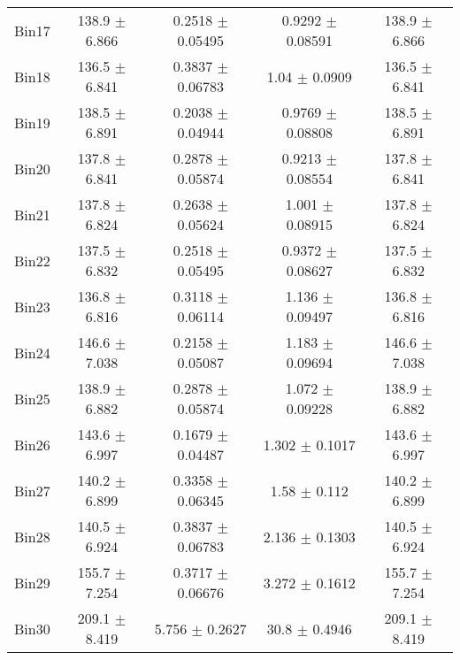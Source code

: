 \begin{tabular}{@{\extracolsep{4pt}}lcccc@{}}
     Bin17 & 138.9 $\pm$ 6.866 & 0.2518 $\pm$ 0.05495 & 0.9292 $\pm$ 0.08591 & 138.9 $\pm$ 6.866 \\ 
     Bin18 & 136.5 $\pm$ 6.841 & 0.3837 $\pm$ 0.06783 & 1.04 $\pm$ 0.0909 & 136.5 $\pm$ 6.841 \\ 
     Bin19 & 138.5 $\pm$ 6.891 & 0.2038 $\pm$ 0.04944 & 0.9769 $\pm$ 0.08808 & 138.5 $\pm$ 6.891 \\ 
     Bin20 & 137.8 $\pm$ 6.841 & 0.2878 $\pm$ 0.05874 & 0.9213 $\pm$ 0.08554 & 137.8 $\pm$ 6.841 \\ 
     Bin21 & 137.8 $\pm$ 6.824 & 0.2638 $\pm$ 0.05624 & 1.001 $\pm$ 0.08915 & 137.8 $\pm$ 6.824 \\ 
     Bin22 & 137.5 $\pm$ 6.832 & 0.2518 $\pm$ 0.05495 & 0.9372 $\pm$ 0.08627 & 137.5 $\pm$ 6.832 \\ 
     Bin23 & 136.8 $\pm$ 6.816 & 0.3118 $\pm$ 0.06114 & 1.136 $\pm$ 0.09497 & 136.8 $\pm$ 6.816 \\ 
     Bin24 & 146.6 $\pm$ 7.038 & 0.2158 $\pm$ 0.05087 & 1.183 $\pm$ 0.09694 & 146.6 $\pm$ 7.038 \\ 
     Bin25 & 138.9 $\pm$ 6.882 & 0.2878 $\pm$ 0.05874 & 1.072 $\pm$ 0.09228 & 138.9 $\pm$ 6.882 \\ 
     Bin26 & 143.6 $\pm$ 6.997 & 0.1679 $\pm$ 0.04487 & 1.302 $\pm$ 0.1017 & 143.6 $\pm$ 6.997 \\ 
     Bin27 & 140.2 $\pm$ 6.899 & 0.3358 $\pm$ 0.06345 & 1.58 $\pm$ 0.112 & 140.2 $\pm$ 6.899 \\ 
     Bin28 & 140.5 $\pm$ 6.924 & 0.3837 $\pm$ 0.06783 & 2.136 $\pm$ 0.1303 & 140.5 $\pm$ 6.924 \\ 
     Bin29 & 155.7 $\pm$ 7.254 & 0.3717 $\pm$ 0.06676 & 3.272 $\pm$ 0.1612 & 155.7 $\pm$ 7.254 \\ 
     Bin30 & 209.1 $\pm$ 8.419 & 5.756 $\pm$ 0.2627 & 30.8 $\pm$ 0.4946 & 209.1 $\pm$ 8.419 \\ 
\hline\hline
  \end{tabular}
